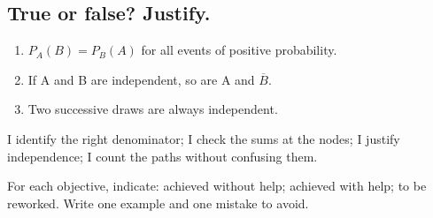 \subsection*{True or false? Justify.}\label{C05-VF}
\begin{enumerate}
\item $P_A(B)=P_B(A)$ for all events of positive probability.
\item If A and B are independent, so are A and $\overline B$.
\item Two successive draws are always independent.
\end{enumerate}
\begin{keypoint}I identify the right denominator; I check the sums at the nodes; I justify independence; I count the paths without confusing them.

For each objective, indicate: achieved without help; achieved with help; to be reworked. Write one example and one mistake to avoid.\end{keypoint}
\endgroup
\ifmxteacher{}\fi
